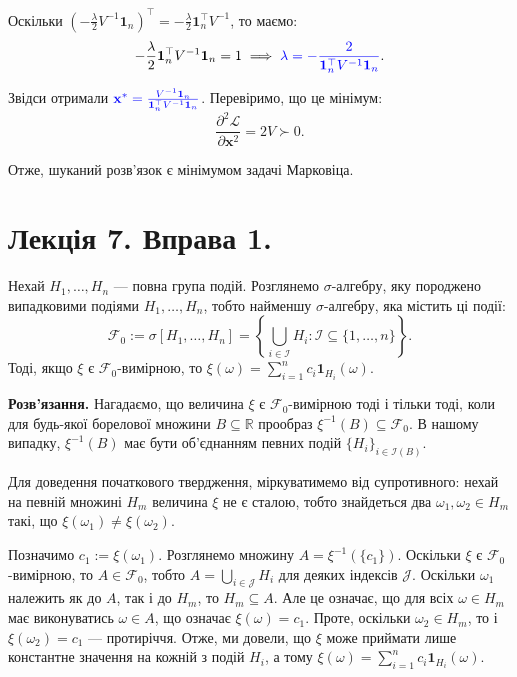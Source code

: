 \documentclass{hw_template}
\begin{document}
Оскільки $\left(-\frac{\lambda}{2}V^{-1}\mathbf{1}_n\right)^{\top}=-\frac{\lambda}{2}\mathbf{1}_n^{\top}V^{-1}$, то маємо:
\begin{equation*}
    -\frac{\lambda}{2}\mathbf{1}_n^{\top}V^{-1}\mathbf{1}_n = 1 \implies \textcolor{blue}{\lambda = -\frac{2}{\mathbf{1}_n^{\top}V^{-1}\mathbf{1}_n}}.
\end{equation*}

Звідси отримали $\textcolor{blue}{\mathbf{x}^* =
\frac{V^{-1}\mathbf{1}_n}{\mathbf{1}_n^{\top}V^{-1}\mathbf{1}_n}}$. Перевіримо, що це мінімум:
\begin{equation*}
    \frac{\partial^2\mathcal{L}}{\partial \mathbf{x}^2} = 2V \succ 0.
\end{equation*}

Отже, шуканий розв'язок є мінімумом задачі Марковіца.

\newpage

\section{Лекція 7. Вправа 1.}

\begin{problem}
    Нехай $H_1,\dots,H_n$ --- повна група подій. Розглянемо $\sigma$-алгебру, 
    яку породжено випадковими подіями $H_1,\dots,H_n$, тобто найменшу 
    $\sigma$-алгебру, яка містить ці події:
    \begin{equation*}
        \mathcal{F}_0 := \sigma[H_1,\dots,H_n] = \left\{\bigcup_{i \in \mathcal{I}} H_i: \mathcal{I} \subseteq \{1,\dots,n\}\right\}.
    \end{equation*}
    Тоді, якщо $\xi$ є $\mathcal{F}_0$-вимірною, то $\xi(\omega) = \sum_{i=1}^n
    c_i\mathbf{1}_{H_i}(\omega)$.
\end{problem}

\textbf{Розв'язання.} Нагадаємо, що величина $\xi$ є $\mathcal{F}_0$-вимірною
тоді і тільки тоді, коли для будь-якої борелової множини $B \subseteq
\mathbb{R}$ прообраз $\xi^{-1}(B) \subseteq \mathcal{F}_0$. В нашому випадку,
$\xi^{-1}(B)$ має бути об'єднанням певних подій $\{H_i\}_{i \in \mathcal{I}(B)}$.

Для доведення початкового твердження, міркуватимемо від супротивного: нехай на
певній множині $H_m$ величина $\xi$ не є сталою, тобто знайдеться два
$\omega_1,\omega_2 \in H_m$ такі, що $\xi(\omega_1) \neq \xi(\omega_2)$.

Позначимо $c_1 := \xi(\omega_1)$. Розглянемо множину $A = \xi^{-1}(\{c_1\})$.
Оскільки $\xi$ є $\mathcal{F}_0$-вимірною, то $A \in \mathcal{F}_0$, тобто
$A=\bigcup_{i \in \mathcal{J}}H_i$ для деяких індексів $\mathcal{J}$. Оскільки
$\omega_1$ належить як до $A$, так і до $H_m$, то $H_m \subseteq A$. Але це
означає, що для всіх $\omega \in H_m$ має виконуватись $\omega \in A$, що
означає $\xi(\omega) = c_1$. Проте, оскільки $\omega_2 \in H_m$, то і
$\xi(\omega_2) = c_1$ --- протиріччя. Отже, ми довели, що $\xi$ може приймати
лише константне значення на кожній з подій $H_i$, а тому $\xi(\omega) =
\sum_{i=1}^n c_i\mathbf{1}_{H_i}(\omega)$.
\end{document}
